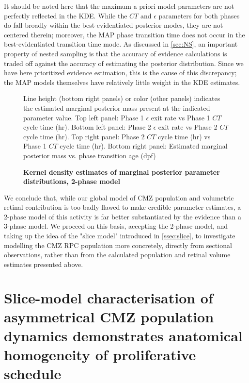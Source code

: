 It should be noted here that the maximum a priori model parameters are not perfectly reflected in the KDE. While the $CT$ and $\epsilon$ parameters for both phases do fall broadly within the best-evidentiated posterior modes, they are not centered therein; moreover, the MAP phase transition time does not occur in the best-evidentiated transition time mode. As discussed in \autoref{sec:NS}, an important property of nested sampling is that the accuracy of evidence calculations is traded off against the accuracy of estimating the posterior distribution. Since we have here prioritized evidence estimation, this is the cause of this discrepancy; the MAP models themselves have relatively little weight in the KDE estimates.

\begin{figure}[!h]
    \caption{{\bf Kernel density estimates of marginal posterior parameter distributions, 2-phase model}}
    Line height (bottom right panels) or color (other panels) indicates the estimated marginal posterior mass present at the indicated parameter value.
    Top left panel: Phase 1 $\epsilon$ exit rate vs Phase 1 $CT$ cycle time (hr).
    Bottom left panel: Phase 2 $\epsilon$ exit rate vs Phase 2 $CT$ cycle time (hr).
    Top right panel: Phase 2 $CT$ cycle time (hr) vs Phase 1 $CT$ cycle time (hr).
    Bottom right panel: Estimated marginal posterior mass vs. phase transition age (dpf)
    \label{phasemarginals}
\end{figure}

We conclude that, while our global model of CMZ population and volumetric retinal contribution is too badly flawed to make credible parameter estimates, a 2-phase model of this activity is far better substantiated by the evidence than a 3-phase model. We proceed on this basis, accepting the 2-phase model, and taking up the idea of the "slice model" introduced in \autoref{ssec:slice}, to investigate modelling the CMZ RPC population more concretely, directly from sectional observations, rather than from the calculated population and retinal volume estimates presented above.

\section{Slice-model characterisation of asymmetrical CMZ population dynamics demonstrates anatomical homogeneity of proliferative schedule}
\label{sec:sliceGMC}

